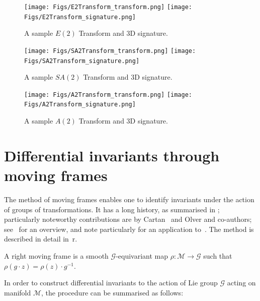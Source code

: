\documentclass[review,onefignum,onetabnum]{siamonline190516}
\begin{document}
\begin{figure}
\centering
\texttt{[image: Figs/E2Transform\_transform.png]}
\texttt{[image: Figs/E2Transform\_signature.png]}
\caption{A sample $E(2)$ Transform and 3D signature.}
\label{fig:E2}
\end{figure}

\begin{figure}
\centering
\texttt{[image: Figs/SA2Transform\_transform.png]}
\texttt{[image: Figs/SA2Transform\_signature.png]}
\caption{A sample $SA(2)$ Transform and 3D signature.}
\label{fig:SA2}
\end{figure}

\begin{figure}
\centering
\texttt{[image: Figs/A2Transform\_transform.png]}
\texttt{[image: Figs/A2Transform\_signature.png]}
\caption{A sample $A(2)$ Transform and 3D signature.}
\label{fig:A2}
\end{figure}

\section{Differential invariants through moving frames}

The method of moving frames enables one to identify invariants under the action of groups of transformations. It has a long history, as summarised in \cite{Olver14}; particularly noteworthy contributions are by Cartan~\cite{Cartan37} and Olver and co-authors; see~\cite{Olver14} for an overview, and note particularly for an application to~\cite{Calabi98}. The method is described in detail in~\cite{OlverCIT}r.

A right moving frame is a smooth $\mathcal{G}$-equivariant map $\rho : \mathcal{M} \to \mathcal{G}$ such that $\rho (g \cdot z) = \rho(z) \cdot g^{-1}$. 

In order to construct differential invariants to the action of Lie group $\mathcal{G}$ acting on manifold $\mathcal{M}$, the procedure can be summarised as follows:
\end{document}
